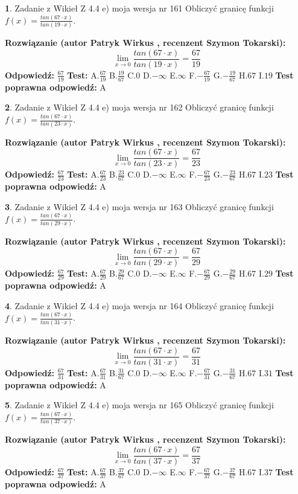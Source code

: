 \documentclass[12pt, a4paper]{article}
\theoremstyle{definition} %
\newtheorem{zad}{}
\newcommand{\zadStart}[1]{\begin{zad}#1\newline}
\newcommand{\zadStop}{\end{zad}}
\newcommand{\rozwStart}[2]{\noindent \textbf{Rozwiązanie (autor #1 , recenzent #2): }\newline}
\newcommand{\rozwStop}{\newline}
\newcommand{\odpStart}{\noindent \textbf{Odpowiedź:}\newline}
\newcommand{\odpStop}{\newline}
\newcommand{\testStart}{\noindent \textbf{Test:}\newline}
\newcommand{\testStop}{\newline}
\newcommand{\kluczStart}{\noindent \textbf{Test poprawna odpowiedź:}\newline}
\newcommand{\kluczStop}{\newline}
\begin{document}
\zadStart{Zadanie z Wikieł Z 4.4 e) moja wersja nr 161}
Obliczyć granicę funkcji $f(x)=\frac{tan(67\cdot x)}{tan(19\cdot x)}$.
\zadStop
\rozwStart{Patryk Wirkus}{Szymon Tokarski}
$$\lim\limits_{x\to 0}\frac{tan(67\cdot x)}{tan(19\cdot x)}=
\frac{67}{19}$$
\rozwStop
\odpStart
$\frac{67}{19}$
\odpStop
\testStart
A.$\frac{67}{19}$
B.$\frac{19}{67}$
C.$0$
D.$-\infty$
E.$\infty$
F.$-\frac{67}{19}$
G.$-\frac{19}{67}$
H.$67$
I.$19$
\testStop
\kluczStart
A
\kluczStop



\zadStart{Zadanie z Wikieł Z 4.4 e) moja wersja nr 162}
Obliczyć granicę funkcji $f(x)=\frac{tan(67\cdot x)}{tan(23\cdot x)}$.
\zadStop
\rozwStart{Patryk Wirkus}{Szymon Tokarski}
$$\lim\limits_{x\to 0}\frac{tan(67\cdot x)}{tan(23\cdot x)}=
\frac{67}{23}$$
\rozwStop
\odpStart
$\frac{67}{23}$
\odpStop
\testStart
A.$\frac{67}{23}$
B.$\frac{23}{67}$
C.$0$
D.$-\infty$
E.$\infty$
F.$-\frac{67}{23}$
G.$-\frac{23}{67}$
H.$67$
I.$23$
\testStop
\kluczStart
A
\kluczStop



\zadStart{Zadanie z Wikieł Z 4.4 e) moja wersja nr 163}
Obliczyć granicę funkcji $f(x)=\frac{tan(67\cdot x)}{tan(29\cdot x)}$.
\zadStop
\rozwStart{Patryk Wirkus}{Szymon Tokarski}
$$\lim\limits_{x\to 0}\frac{tan(67\cdot x)}{tan(29\cdot x)}=
\frac{67}{29}$$
\rozwStop
\odpStart
$\frac{67}{29}$
\odpStop
\testStart
A.$\frac{67}{29}$
B.$\frac{29}{67}$
C.$0$
D.$-\infty$
E.$\infty$
F.$-\frac{67}{29}$
G.$-\frac{29}{67}$
H.$67$
I.$29$
\testStop
\kluczStart
A
\kluczStop



\zadStart{Zadanie z Wikieł Z 4.4 e) moja wersja nr 164}
Obliczyć granicę funkcji $f(x)=\frac{tan(67\cdot x)}{tan(31\cdot x)}$.
\zadStop
\rozwStart{Patryk Wirkus}{Szymon Tokarski}
$$\lim\limits_{x\to 0}\frac{tan(67\cdot x)}{tan(31\cdot x)}=
\frac{67}{31}$$
\rozwStop
\odpStart
$\frac{67}{31}$
\odpStop
\testStart
A.$\frac{67}{31}$
B.$\frac{31}{67}$
C.$0$
D.$-\infty$
E.$\infty$
F.$-\frac{67}{31}$
G.$-\frac{31}{67}$
H.$67$
I.$31$
\testStop
\kluczStart
A
\kluczStop



\zadStart{Zadanie z Wikieł Z 4.4 e) moja wersja nr 165}
Obliczyć granicę funkcji $f(x)=\frac{tan(67\cdot x)}{tan(37\cdot x)}$.
\zadStop
\rozwStart{Patryk Wirkus}{Szymon Tokarski}
$$\lim\limits_{x\to 0}\frac{tan(67\cdot x)}{tan(37\cdot x)}=
\frac{67}{37}$$
\rozwStop
\odpStart
$\frac{67}{37}$
\odpStop
\testStart
A.$\frac{67}{37}$
B.$\frac{37}{67}$
C.$0$
D.$-\infty$
E.$\infty$
F.$-\frac{67}{37}$
G.$-\frac{37}{67}$
H.$67$
I.$37$
\testStop
\kluczStart
A
\kluczStop
\end{document}
